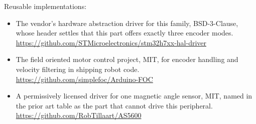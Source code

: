 Reusable implementations:
\begin{itemize}
\item The vendor's hardware abstraction driver for this family, BSD-3-Clause,
whose header settles that this part offers exactly three encoder modes.\newline
\url{https://github.com/STMicroelectronics/stm32h7xx-hal-driver}
\item The field oriented motor control project, MIT, for encoder handling and
velocity filtering in shipping robot code.\newline
\url{https://github.com/simplefoc/Arduino-FOC}
\item A permissively licensed driver for one magnetic angle sensor, MIT, named
in the prior art table as the part that cannot drive this peripheral.\newline
\url{https://github.com/RobTillaart/AS5600}
\end{itemize}

